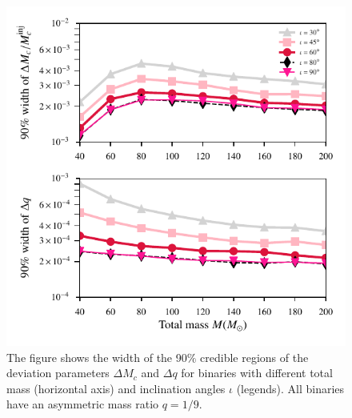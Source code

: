 \documentclass[prd,preprintnumbers,twocolumn,eqsecnum,floatfix,a4paper,nofootinbib,superscriptaddress]{revtex4}
\begin{document}
 \begin{figure}[tbh]
 	\begin{center}
 		\includegraphics[scale=0.8]{figs/hm_9dim_dmcbymcinj_dq_diff_M.pdf}
 	\end{center} 
 	\caption{The figure shows the width of the 90$\%$ credible regions of the deviation parameters $\Delta M_c$ and $\Delta q$ for binaries with different total mass (horizontal axis) and inclination angles $\iota$ (legends). All binaries have an asymmetric mass ratio $q=1/9$.}
 	\label{fig:delmc_delq_varyingM}
 \end{figure}
 
\end{document}
